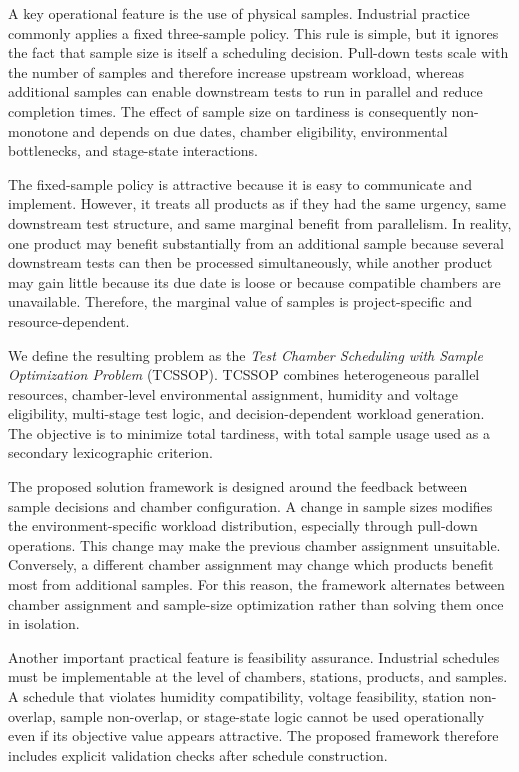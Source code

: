 \documentclass[11pt]{article}
\begin{document}
A key operational feature is the use of physical samples. Industrial practice commonly applies a fixed three-sample policy. This rule is simple, but it ignores the fact that sample size is itself a scheduling decision. Pull-down tests scale with the number of samples and therefore increase upstream workload, whereas additional samples can enable downstream tests to run in parallel and reduce completion times. The effect of sample size on tardiness is consequently non-monotone and depends on due dates, chamber eligibility, environmental bottlenecks, and stage-state interactions.

The fixed-sample policy is attractive because it is easy to communicate and implement. However, it treats all products as if they had the same urgency, same downstream test structure, and same marginal benefit from parallelism. In reality, one product may benefit substantially from an additional sample because several downstream tests can then be processed simultaneously, while another product may gain little because its due date is loose or because compatible chambers are unavailable. Therefore, the marginal value of samples is project-specific and resource-dependent.

We define the resulting problem as the \emph{Test Chamber Scheduling with Sample Optimization Problem} (TCSSOP). TCSSOP combines heterogeneous parallel resources, chamber-level environmental assignment, humidity and voltage eligibility, multi-stage test logic, and decision-dependent workload generation. The objective is to minimize total tardiness, with total sample usage used as a secondary lexicographic criterion.

The proposed solution framework is designed around the feedback between sample decisions and chamber configuration. A change in sample sizes modifies the environment-specific workload distribution, especially through pull-down operations. This change may make the previous chamber assignment unsuitable. Conversely, a different chamber assignment may change which products benefit most from additional samples. For this reason, the framework alternates between chamber assignment and sample-size optimization rather than solving them once in isolation.

Another important practical feature is feasibility assurance. Industrial schedules must be implementable at the level of chambers, stations, products, and samples. A schedule that violates humidity compatibility, voltage feasibility, station non-overlap, sample non-overlap, or stage-state logic cannot be used operationally even if its objective value appears attractive. The proposed framework therefore includes explicit validation checks after schedule construction.
\end{document}

